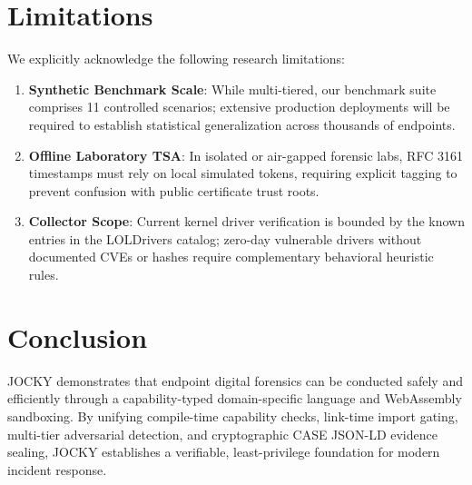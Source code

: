 \documentclass[10pt,conference]{IEEEtran}
\begin{document}
\section{Limitations}
We explicitly acknowledge the following research limitations:
\begin{enumerate}
    \item \textbf{Synthetic Benchmark Scale}: While multi-tiered, our benchmark suite comprises 11 controlled scenarios; extensive production deployments will be required to establish statistical generalization across thousands of endpoints.
    \item \textbf{Offline Laboratory TSA}: In isolated or air-gapped forensic labs, RFC 3161 timestamps must rely on local simulated tokens, requiring explicit tagging to prevent confusion with public certificate trust roots.
    \item \textbf{Collector Scope}: Current kernel driver verification is bounded by the known entries in the LOLDrivers catalog; zero-day vulnerable drivers without documented CVEs or hashes require complementary behavioral heuristic rules.
\end{enumerate}

\section{Conclusion}
JOCKY demonstrates that endpoint digital forensics can be conducted safely and efficiently through a capability-typed domain-specific language and WebAssembly sandboxing. By unifying compile-time capability checks, link-time import gating, multi-tier adversarial detection, and cryptographic CASE JSON-LD evidence sealing, JOCKY establishes a verifiable, least-privilege foundation for modern incident response.
\end{document}
